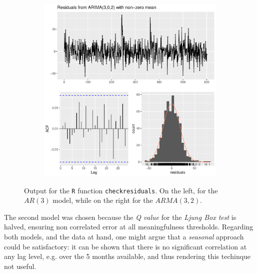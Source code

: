 \documentclass[11pt,a4paper,final]{paper}
\begin{document}
\begin{figure}[h]
\begin{subfigure}[b]{0.49\textwidth}
				\includegraphics[width=\textwidth]{../images/check_residuals.pdf}	
	\end{subfigure}
	\caption{Output for the \texttt{R} function \texttt{checkresiduals}. On the left, for the $AR(3)$ model, while on the right for the $ARMA(3,2)$.}
	\label{fig:checkresults}
\end{figure}

The second model was chosen because the \textit{Q value }for the \textit{Ljung Box test }is halved, ensuring non correlated error at all meaningfulness thresholds. Regarding both models, and the data at hand, one might argue that a \textit{seasonal} approach could be satisfactory:
it can be shown that there is no significant correlation at any lag level, e.g. over the 5 months available, and thus rendering this techinque not useful.

\end{document}

